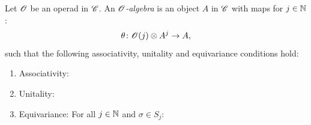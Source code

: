    \begin{defin}
        Let $\mathscr{O}$ be an operad in $\mathscr{C}$. An $\mathscr{O}${\em -algebra} is an object $A$ in
        $\mathscr{C}$ with maps for $j \in \mathbb{N}$:
        \[
            \theta \colon \mathscr{O}(j) \otimes A^j \rightarrow A,
        \]
        such that the following associativity, unitality and equivariance
        conditions hold:
        \begin{enumerate}
            \item Associativity:
                \begin{center}
                \end{center}
            \item Unitality:
                \begin{center}
                \end{center}
            \item Equivariance: For all $j \in \mathbb{N}$ and $\sigma \in S_j$:
                \begin{center}
                \end{center} 
        \end{enumerate}
    \end{defin}

